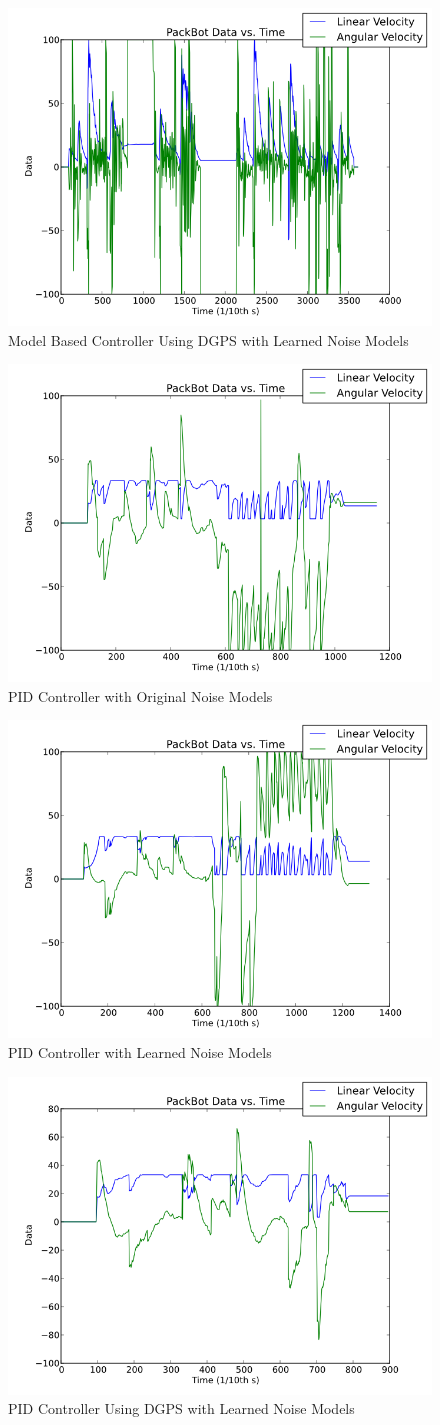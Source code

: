 \begin{figure}[ht!]
	\centering
	\includegraphics[width=.5\textwidth]{images/pbtx/20101203_1606_pbtxLyapUsingDgpsNewQR}
	\caption{Model Based Controller Using DGPS with Learned Noise Models}
	\label{fig:resultsLyapunov3}
\end{figure}

\begin{figure}[ht!]
	\centering
	\includegraphics[width=.5\textwidth]{images/pbtx/20101203_1755_pbtxPidOrigQR}
	\caption{PID Controller with Original Noise Models}
	\label{fig:resultsLyapunov4}
\end{figure}

\begin{figure}[ht!]
	\centering
	\includegraphics[width=.5\textwidth]{images/pbtx/20101203_1751_pbtxPidNewQR}
	\caption{PID Controller with Learned Noise Models}
	\label{fig:resultsLyapunov5}
\end{figure}

\begin{figure}[ht!]
	\centering
	\includegraphics[width=.5\textwidth]{images/pbtx/20101203_1803_pbtxPidUsingDgpsNewQR}
	\caption{PID Controller Using DGPS with Learned Noise Models}
	\label{fig:resultsLyapunov6}
\end{figure}


